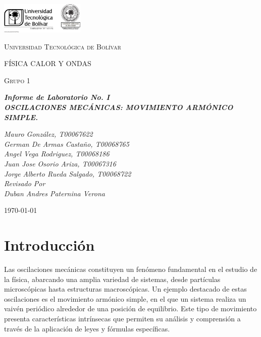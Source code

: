 \documentclass[twocolumn, 12pt]{article}
\begin{document}
\begin{titlepage}
    \centering
    \includegraphics[width=0.3\textwidth]{Images/logo_utb.png}\par\vspace{1cm}
    {\scshape\LARGE Universidad Tecnológica de Bolívar \par}
    \vspace{1cm}

    {\scshape\Large FÍSICA CALOR Y ONDAS \par}
    \vspace{.2cm}

    {\scshape\Large Grupo 1 \par}
    \vspace{1cm}
    \slshape {\Large \bfseries{}Informe de Laboratorio No. I\\}
    \slshape {\small \bfseries{} OSCILACIONES MECÁNICAS: MOVIMIENTO ARMÓNICO SIMPLE.}
    \vspace{2cm}

    \slshape {\itshape{} Mauro González, T00067622 \\}
    \slshape {\itshape{} German De Armas Castaño, T00068765 \\}
    \slshape {\itshape{} Angel Vega Rodriguez, T00068186 \\}
    \slshape {\itshape{} Juan Jose Osorio Ariza, T00067316 \\}
    \slshape {\itshape{} Jorge Alberto Rueda Salgado, T00068722 \\}
    \vfill
    Revisado Por \\
    Duban Andres Paternina Verona\\
    {\large \today\par}
\end{titlepage}

\section{Introducción}

Las oscilaciones mecánicas constituyen un fenómeno
fundamental en el estudio de la física, abarcando una
amplia variedad de sistemas, desde partículas microscópicas
hasta estructuras macroscópicas. Un ejemplo destacado de
estas oscilaciones es el movimiento armónico simple, en el
que un sistema realiza un vaivén periódico alrededor de una
posición de equilibrio. Este tipo de movimiento presenta
características intrínsecas que permiten su análisis y
comprensión a través de la aplicación de leyes y fórmulas
específicas.
\end{document}
